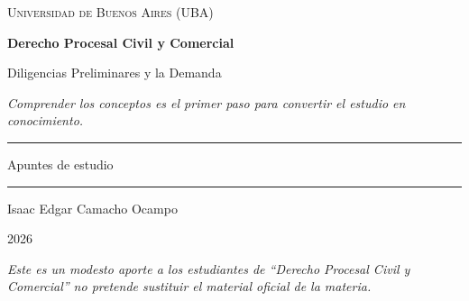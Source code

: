 \documentclass[12pt,oneside]{book}
\newcommand{\universidad}{Universidad de Buenos Aires (UBA)}
\newcommand{\materia}{Derecho Procesal Civil y Comercial}
\newcommand{\titulo}{Diligencias Preliminares y la Demanda}
\newcommand{\autor}{Isaac Edgar Camacho Ocampo}
\newcommand{\anio}{2026}
\begin{document}
\begin{titlepage}

\thispagestyle{empty}

\begin{center}

\vspace*{1cm}

{\large \textsc{\universidad}}

\vspace{3cm}

{\Huge \textbf{\materia}}

\vspace{1cm}

{\LARGE \titulo}

\vspace{0.8cm}

\textit{Comprender los conceptos es el primer paso para convertir el estudio en conocimiento.}

\vspace{1.2cm}

\rule{0.70\textwidth}{0.5pt}

\vspace{0.5cm}

{\large Apuntes de estudio}

\vspace{0.5cm}

\rule{0.70\textwidth}{0.5pt}

\vfill

{\large \autor}

\vspace{0.3cm}

{\large \anio}

\end{center}

\vfill

\begin{flushleft}
\textit{Este es un modesto aporte a los estudiantes de ``Derecho Procesal Civil y Comercial'' no pretende sustituir el material oficial de la materia.}
\end{flushleft}

\end{titlepage}

\tableofcontents

\end{document}

